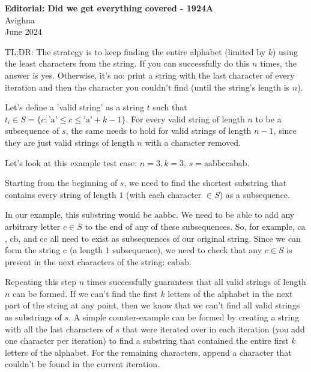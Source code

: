 \documentclass{article}
\begin{document}
\begin{center}
  \large{\textbf{Editorial: Did we get everything covered - 1924A}}\\
  \vspace{0.2em}
  \large{Avighna}\\
  \vspace{0.2em}
  \large{June 2024}
\end{center}

TL;DR: The strategy is to keep finding the entire alphabet (limited by $k$) using the least characters from the string. If you can successfully do this $n$ times, the answer is yes. Otherwise, it's no: print a string with the last character of every iteration and then the character you couldn't find (until the string's length is $n$).

Let's define a 'valid string' as a string $t$ such that $t_i \in S=\{c : \text{'a'} \le c \le \text{'a'}+k-1\}$. For every valid string of length $n$ to be a subsequence of $s$, the same needs to hold for valid strings of length $n-1$, since they are just valid strings of length $n$ with a character removed.

Let's look at this example test case: $n=3,k=3$, $s=\text{aabbccabab}$.

Starting from the beginning of $s$, we need to find the shortest substring that contains every string of length $1$ (with each character $\in S$) as a subsequence.

In our example, this substring would be $\text{aabbc}$. We need to be able to add any arbitrary letter $c \in S$ to the end of any of these subsequences. So, for example, $\text{ca}$, $\text{cb}$, and $\text{cc}$ all need to exist as subsequences of our original string. Since we can form the string $\text{c}$ (a length $1$ subsequence), we need to check that any $c \in S$ is present in the next characters of the string: $\text{cabab}$.

Repeating this step $n$ times successfully guarantees that all valid strings of length $n$ can be formed. If we can't find the first $k$ letters of the alphabet in the next part of the string at any point, then we know that we can't find all valid strings as substrings of $s$. A simple counter-example can be formed by creating a string with all the last characters of $s$ that were iterated over in each iteration (you add one character per iteration) to find a substring that contained the entire first $k$ letters of the alphabet. For the remaining characters, append a character that couldn't be found in the current iteration.
\end{document}
